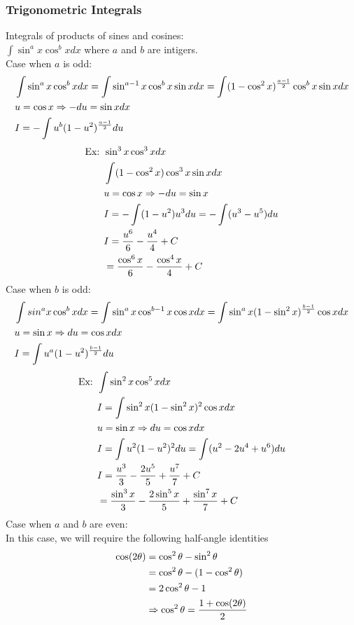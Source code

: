\documentclass[11pt, fleqn]{article}
\begin{document}
\subsubsection{Trigonometric Integrals}
Integrals of products of sines and cosines:\\
$\int\sin^ax\cos^bxdx$ where $a$ and $b$ are intigers.\\
Case when $a$ is odd:
\begin{align*}
    &\int\sin^ax\cos^bxdx=\int\sin^{a-1}x\cos^bx\sin xdx=\int(1-\cos^2x)^{\frac{a-1}{2}}\cos^bx\sin xdx\\
    &u=\cos x\Rightarrow -du=\sin xdx\\
    &I=-\int u^b(1-u^2)^{\frac{a-1}{2}}du
\end{align*}
\begin{align*}
    \text{Ex: }&\sin^3x\cos^3xdx\\
    &\int(1-\cos^2x)\cos^3x\sin xdx\\
    &u=\cos x\Rightarrow -du=\sin x\\
    &I=-\int(1-u^2)u^3du=-\int(u^3-u^5)du\\
    &I=\frac{u^6}{6}-\frac{u^4}{4}+C\\
    &=\frac{\cos^6x}{6}-\frac{\cos^4x}{4}+C
\end{align*}
Case when $b$ is odd:
\begin{align*}
    &\int sin^ax\cos^bxdx=\int\sin^ax\cos^{b-1}x\cos xdx=\int\sin^ax(1-\sin^2 x)^{\frac{b-1}{2}}\cos xdx\\
    &u=\sin x\Rightarrow du=\cos xdx\\
    &I=\int u^a(1-u^2)^\frac{b-1}{2}du
\end{align*}
\begin{align*}
    \text{Ex: }&\int\sin^2x\cos^5xdx\\
    &I=\int\sin^2x(1-\sin^2x)^2\cos xdx\\
    &u=\sin x\Rightarrow du=\cos xdx\\
    &I=\int u^2(1-u^2)^2du=\int(u^2-2u^4+u^6)du\\
    &I=\frac{u^3}{3}-\frac{2u^5}{5}+\frac{u^7}{7}+C\\
    &=\frac{\sin^3 x}{3}-\frac{2\sin^5x}{5}+\frac{\sin^7x}{7}+C
\end{align*}
Case when $a$ and $b$ are even:\\
In this case, we will require the following half-angle identities
\begin{align*}
    \cos(2\theta)&=\cos^2\theta-\sin^2\theta\\
    &=\cos^2\theta-(1-\cos^2\theta)\\
    &=2\cos^2\theta-1\\
    &\Rightarrow\cos^2\theta=\frac{1+\cos(2\theta)}{2}
\end{align*}
\end{document}
